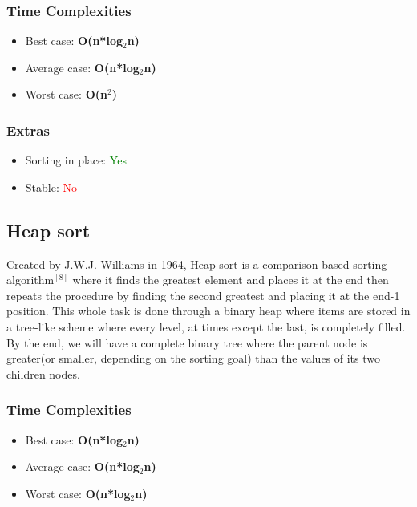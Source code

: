 \documentclass{article}
\begin{document}
\begin{multicols}{2}
\subsubsection{Time Complexities}
\begin{itemize}
    \item Best case: \textbf{O(n*log$_2$n)}
    \item Average case: \textbf{O(n*log$_2$n)}
    \item Worst case: \textbf{O(n$^2$)}
\end{itemize}

\subsubsection{Extras}
\begin{itemize}
    \item Sorting in place: \textcolor{green}{Yes}
    \item Stable: \textcolor{red}{No}
\end{itemize}

\bigbreak \bigbreak \bigbreak \bigbreak \bigbreak \bigbreak \bigbreak \bigbreak \bigbreak \bigbreak \bigbreak \bigbreak \bigbreak \bigbreak \bigbreak \bigbreak \bigbreak \bigbreak \bigbreak \bigbreak


\subsection{Heap sort}
Created by J.W.J. Williams in 1964, Heap sort is a comparison based sorting algorithm$^{[8]}$ where it  finds the greatest element and places it at the end then repeats the procedure by finding the second greatest and placing it at the end-1 position. This whole task is done through a binary heap where items are stored in a tree-like scheme where every level, at times except the last, is completely filled. By the end, we will have a complete binary tree where the parent node is greater(or smaller, depending on the sorting goal) than the values of its two children nodes.
\subsubsection{Time Complexities}
\begin{itemize}
    \item Best case: \textbf{O(n*log$_2$n)}
    \item Average case: \textbf{O(n*log$_2$n)}
    \item Worst case: \textbf{O(n*log$_2$n)}
\end{itemize}


\end{multicols}
\end{document}
